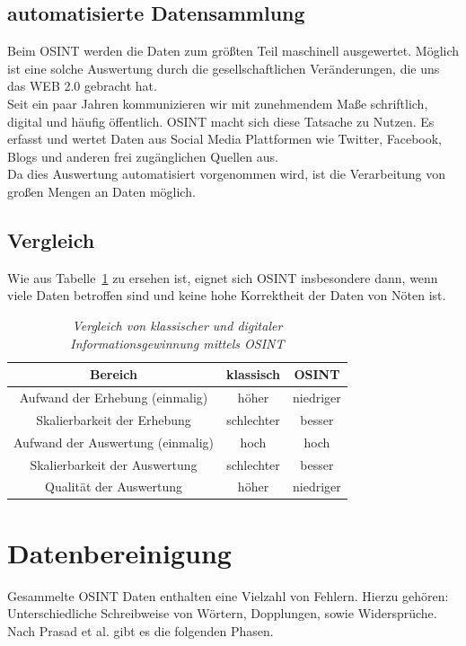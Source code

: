 \documentclass[twoside,a4paper]{article}
\begin{document}
\subsection{automatisierte Datensammlung}
Beim OSINT werden die Daten zum größten Teil maschinell ausgewertet. Möglich ist eine solche Auswertung durch die gesellschaftlichen Veränderungen, die uns das WEB 2.0 gebracht hat. \\
Seit ein paar Jahren kommunizieren wir mit zunehmendem Maße schriftlich, digital und häufig öffentlich. 
OSINT macht sich diese Tatsache zu Nutzen. Es erfasst und wertet Daten aus Social Media Plattformen wie Twitter, Facebook, Blogs und anderen frei zugänglichen Quellen aus.\\
Da dies Auswertung automatisiert vorgenommen wird, ist die Verarbeitung von großen Mengen an Daten möglich.
 
\subsection{Vergleich}
Wie aus Tabelle~\ref{tab:Vergleich} zu ersehen ist, eignet sich OSINT insbesondere dann, wenn viele Daten betroffen sind und keine hohe Korrektheit der Daten von Nöten ist.

\begin{table}[htdp]
  \caption{\it Vergleich von klassischer und digitaler Informationsgewinnung mittels OSINT}
  \begin{center}
    \begin{tabular}{|c|c|c|}\hline
      \textbf{Bereich} & \textbf{klassisch} & \textbf{OSINT} \\\hline
      Aufwand der Erhebung (einmalig)	& höher & niedriger\\
      Skalierbarkeit der Erhebung 		& schlechter & besser\\
      Aufwand der Auswertung (einmalig) 	& hoch & hoch\\
	  Skalierbarkeit der Auswertung 		& schlechter & besser\\
	  Qualität der Auswertung 			& höher & niedriger\\	  
     \hline
    \end{tabular}
  \end{center}
  \label{tab:Vergleich}
\end{table}


\section{Datenbereinigung}
Gesammelte OSINT Daten enthalten eine Vielzahl von Fehlern. Hierzu gehören: Unterschiedliche Schreibweise von Wörtern, Dopplungen, sowie Widersprüche. Nach Prasad et al.\cite{data_consolidation_solution} gibt es die folgenden Phasen.
\end{document}

